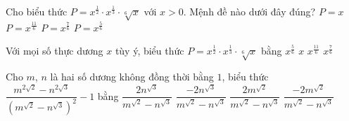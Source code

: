 \begin{ex}%
	Cho biểu thức $P =  x^{\tfrac{1}{2}} \cdot x^{\tfrac{1}{3}} \cdot \sqrt[6]{x}$ với $x > 0$. Mệnh đề nào dưới đây đúng?
	 \choice
		 {\True $P = x$}
		 {$P = x^{\tfrac{11}{6}}$}
		{$P =  x^{\tfrac{7}{6}}$}
		 {$P = x^{\tfrac{5}{6}}$}
\end{ex}

\begin{ex}%
	Với mọi  số thực dương $x$ tùy ý, biểu thức $P=x^{\frac{1}{2}}\cdot x^{\frac{1}{3}}\cdot\sqrt[6]{x}$ bằng
	 \choice
		{$x^{\frac{5}{6}}$} 
		 {\True $x$}
		 {$x^{\frac{11}{6}}$}
		{$x^{\frac{7}{6}}$} 
\end{ex}

\begin{ex}%
	Cho $m$, $n$ là hai số dương không  đồng thời bằng $1$, biểu thức
	$\dfrac{m^{2\sqrt{2}}-n^{2\sqrt{3}}}{\left(m^{\sqrt{2}}-n^{\sqrt{3}}\right)^2}-1$ bằng 
	 \choice
		{\True  $\dfrac{2n^{\sqrt{3}}}{m^{\sqrt{2}}-n^{\sqrt{3}}}$}
		{$\dfrac{-2n^{\sqrt{3}}}{m^{\sqrt{2}}-n^{\sqrt{3}}}$} 
		 {$\dfrac{2m^{\sqrt{2}}}{m^{\sqrt{2}}-n^{\sqrt{3}}}$}
		{$\dfrac{-2m^{\sqrt{2}}}{m^{\sqrt{2}}-n^{\sqrt{3}}}$} 
\end{ex}

